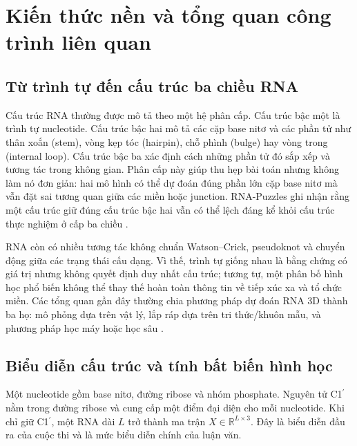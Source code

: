 \documentclass[12pt,a4paper,oneside]{report}
\newcommand{\cprime}{C1$^{\prime}$}
\begin{document}
\chapter{Kiến thức nền và tổng quan công trình liên quan}

\section{Từ trình tự đến cấu trúc ba chiều RNA}

Cấu trúc RNA thường được mô tả theo một hệ phân cấp. Cấu trúc bậc một là trình tự
nucleotide. Cấu trúc bậc hai mô tả các cặp base nitơ và các phần tử như thân xoắn
(stem), vòng kẹp tóc (hairpin), chỗ phình (bulge) hay vòng trong (internal loop). Cấu
trúc bậc ba xác định cách những phần tử đó sắp xếp và tương tác
trong không gian. Phân cấp này giúp thu hẹp bài toán nhưng không làm nó đơn giản: hai
mô hình có thể dự đoán đúng phần lớn cặp base nitơ mà vẫn đặt sai tương quan giữa các miền
hoặc junction. RNA-Puzzles ghi nhận rằng một cấu trúc giữ đúng cấu trúc bậc hai vẫn có
thể lệch đáng kể khỏi cấu trúc thực nghiệm ở cấp ba chiều
\cite{rna_puzzles,rna_puzzles_toolkit}.

RNA còn có nhiều tương tác không chuẩn Watson--Crick, pseudoknot và chuyển động giữa
các trạng thái cấu dạng. Vì thế, trình tự giống nhau là bằng chứng có giá trị nhưng
không quyết định duy nhất cấu trúc; tương tự, một phân bố hình học phổ biến không thể thay
thế hoàn toàn thông tin về tiếp xúc xa và tổ chức miền. Các tổng quan gần đây thường
chia phương pháp dự đoán RNA 3D thành ba họ: mô phỏng dựa trên vật lý, lắp ráp dựa trên
tri thức/khuôn mẫu, và phương pháp học máy hoặc học sâu
\cite{rna_progress_review,state_of_rnart,computational_rna_review}.

\section{Biểu diễn cấu trúc và tính bất biến hình học}

Một nucleotide gồm base nitơ, đường ribose và nhóm phosphate. Nguyên tử \cprime{} nằm trong
đường ribose và cung cấp một điểm đại diện cho mỗi nucleotide. Khi chỉ giữ \cprime{},
một RNA dài $L$ trở thành ma trận $X\in\mathbb{R}^{L\times3}$. Đây là biểu diễn đầu ra
của cuộc thi và là mức biểu diễn chính của luận văn.
\end{document}

